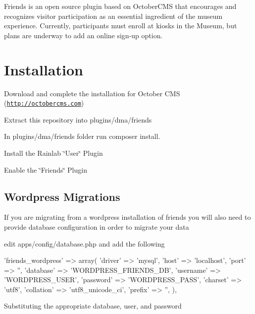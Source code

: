 Friends is an open source plugin based on October\-C\-M\-S that encourages and recognizes visitor participation as an essential ingredient of the museum experience. Currently, participants must enroll at kiosks in the Museum, but plans are underway to add an online sign-\/up option.

\section*{Installation}


\begin{DoxyItemize}
\item Download and complete the installation for October C\-M\-S (\href{http://octobercms.com}{\tt http\-://octobercms.\-com})
\item Extract this repository into plugins/dma/friends
\item In plugins/dma/friends folder run {\ttfamily composer install}.
\item Install the Rainlab \char`\"{}\-User\char`\"{} Plugin
\item Enable the \char`\"{}\-Friends\char`\"{} Plugin
\end{DoxyItemize}

\subsection*{Wordpress Migrations}

If you are migrating from a wordpress installation of friends you will also need to provide database configuration in order to migrate your data


\begin{DoxyItemize}
\item edit apps/config/database.\-php and add the following 
\begin{DoxyPre}
        'friends\_wordpress' => array(
            'driver'    => 'mysql',
            'host'      => 'localhost',
            'port'      => '', 
            'database'  => 'WORDPRESS\_FRIENDS\_DB',
            'username'  => 'WORDPRESS\_USER',
            'password'  => 'WORDPRESS\_PASS',
            'charset'   => 'utf8',
            'collation' => 'utf8\_unicode\_ci',
            'prefix'    => '', 
        ), 
\end{DoxyPre}
 Substituting the appropriate database, user, and password 
\end{DoxyItemize}